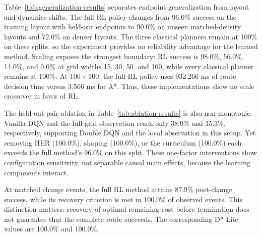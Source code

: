 Table~\ref{tab:generalization-results} separates endpoint generalization from layout and dynamics shifts. The full RL policy changes from 96.0\% success on the training layout with held-out endpoints to 90.0\% on unseen matched-density layouts and 72.0\% on denser layouts. The three classical planners remain at 100\% on these splits, so the experiment provides no reliability advantage for the learned method. Scaling exposes the strongest boundary: RL success is 98.0\%, 56.0\%, 14.0\%, and 0.0\% at grid widths 15, 30, 50, and 100, while every classical planner remains at 100\%. At $100\times100$, the full RL policy uses 932.266 ms of route decision time versus 3.566 ms for A*. Thus, these implementations show no scale crossover in favor of RL.

The held-out-pair ablation in Table~\ref{tab:ablation-results} is also non-monotonic. Vanilla DQN and the full-grid observation reach only 38.0\% and 15.3\%, respectively, supporting Double DQN and the local observation in this setup. Yet removing HER (100.0\%), shaping (100.0\%), or the curriculum (100.0\%) each exceeds the full method's 96.0\% on this split. These one-factor interventions show configuration sensitivity, not separable causal main effects, because the learning components interact.

At matched change events, the full RL method attains 87.9\% post-change success, while its recovery criterion is met in 100.0\% of observed events. This distinction matters: recovery of optimal remaining cost before termination does not guarantee that the complete route succeeds. The corresponding D* Lite values are 100.0\% and 100.0\%.
